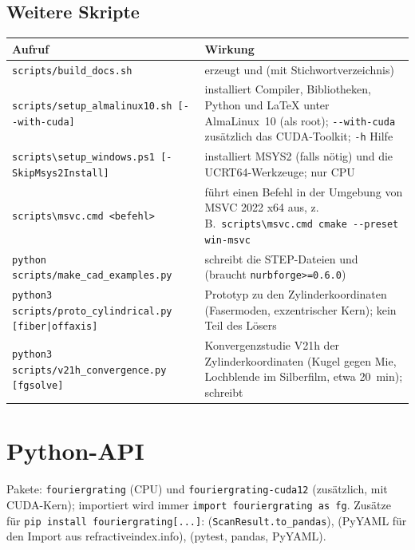 \subsection*{Weitere Skripte}
\begin{center}
\small
\begin{tabularx}{\linewidth}{>{\raggedright\arraybackslash}p{5.6cm}Y}
\toprule
Aufruf & Wirkung \\
\midrule
\texttt{scripts/build\_docs.sh} & erzeugt
 und  (mit Stichwortverzeichnis) \\
\texttt{scripts/setup\_almalinux10.sh [-{}-with-cuda]} &
installiert Compiler, Bibliotheken, Python und \LaTeX{} unter AlmaLinux~10 (als root); \texttt{-{}-with-cuda}
zusätzlich das CUDA-Toolkit; \texttt{-h} Hilfe \\
\texttt{scripts\textbackslash setup\_windows.ps1 [-SkipMsys2Install]}
& installiert MSYS2 (falls nötig) und die UCRT64-Werkzeuge; nur CPU \\
\texttt{scripts\textbackslash msvc.cmd <befehl>} & führt einen Befehl in der
Umgebung von MSVC 2022 x64 aus, z.\,B.\ \texttt{scripts\textbackslash msvc.cmd cmake -{}-preset win-msvc} \\
\texttt{python scripts/make\_cad\_examples.py} & schreibt
die STEP-Dateien  und  (braucht \texttt{nurbforge>=0.6.0}) \\
\texttt{python3 scripts/proto\_cylindrical.py [fiber|offaxis]}
& Prototyp zu den Zylinderkoordinaten (Fasermoden, exzentrischer Kern); kein Teil des Lösers \\
\texttt{python3 scripts/v21h\_convergence.py [fgsolve]}
& Konvergenzstudie V21h der Zylinderkoordinaten (Kugel gegen Mie, Lochblende im Silberfilm, etwa 20~min); schreibt
 \\
\bottomrule
\end{tabularx}
\end{center}

\section{Python-API}\label{sec:ref-python}
Pakete: \texttt{fouriergrating} (CPU) und \texttt{fouriergrating-cuda12} (zusätzlich, mit CUDA-Kern); importiert wird
immer \texttt{import fouriergrating as fg}. Zusätze für \texttt{pip install fouriergrating[...]}: 
(\texttt{ScanResult.to\_pandas}),  (PyYAML für den Import aus refractiveindex.info), 
(pytest, pandas, PyYAML).


